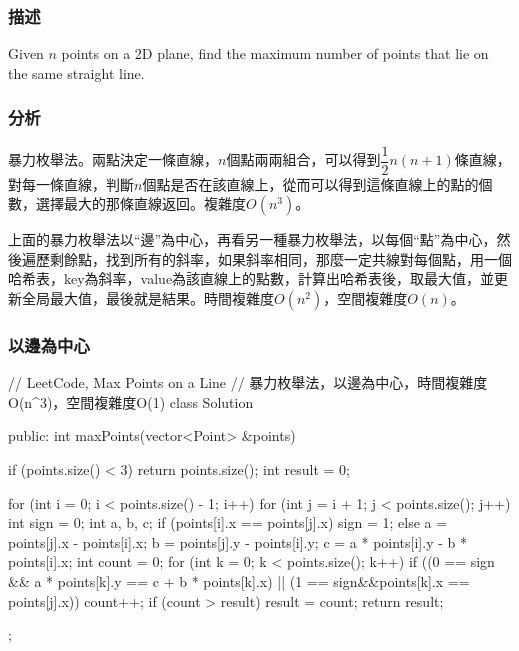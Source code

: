 \subsubsection{描述}
Given $n$ points on a 2D plane, find the maximum number of points that lie on the same straight line.


\subsubsection{分析}
暴力枚舉法。兩點決定一條直線，$n$個點兩兩組合，可以得到$\dfrac{1}{2}n(n+1)$條直線，對每一條直線，判斷$n$個點是否在該直線上，從而可以得到這條直線上的點的個數，選擇最大的那條直線返回。複雜度$O(n^3)$。

上面的暴力枚舉法以“邊”為中心，再看另一種暴力枚舉法，以每個“點”為中心，然後遍歷剩餘點，找到所有的斜率，如果斜率相同，那麼一定共線對每個點，用一個哈希表，key為斜率，value為該直線上的點數，計算出哈希表後，取最大值，並更新全局最大值，最後就是結果。時間複雜度$O(n^2)$，空間複雜度$O(n)$。


\subsubsection{以邊為中心}
\begin{Code}
// LeetCode, Max Points on a Line
// 暴力枚舉法，以邊為中心，時間複雜度O(n^3)，空間複雜度O(1)
class Solution {
public:
    int maxPoints(vector<Point> &points) {
        if (points.size() < 3) return points.size();
        int result = 0;

        for (int i = 0; i < points.size() - 1; i++) {
            for (int j = i + 1; j < points.size(); j++) {
                int sign = 0;
                int a, b, c;
                if (points[i].x == points[j].x) sign = 1;
                else {
                    a = points[j].x - points[i].x;
                    b = points[j].y - points[i].y;
                    c = a * points[i].y - b * points[i].x;
                }
                int count = 0;
                for (int k = 0; k < points.size(); k++) {
                    if ((0 == sign && a * points[k].y == c +  b * points[k].x) || 
                        (1 == sign&&points[k].x == points[j].x)) 
                        count++;
                }
                if (count > result) result = count;
            }
        }
        return result;
    }
};
\end{Code}


